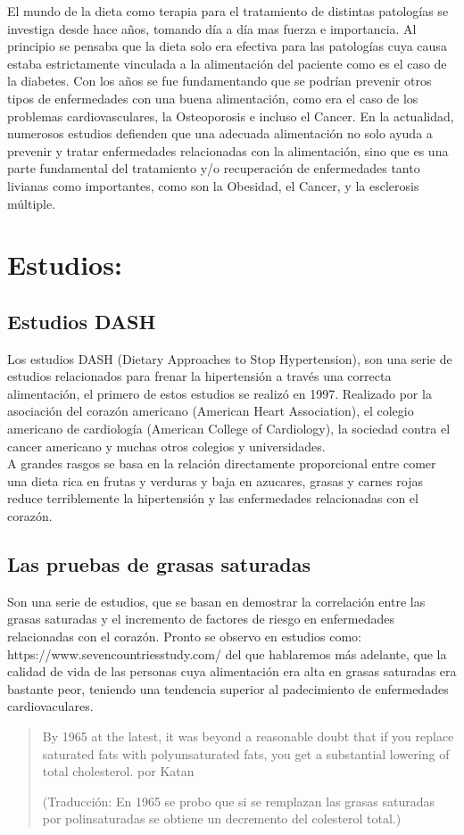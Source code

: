 
El mundo de la dieta como terapia para el tratamiento de distintas patologías se investiga desde hace años, tomando día a día mas fuerza e importancia. Al principio se pensaba que la dieta solo era efectiva para las patologías cuya causa estaba estrictamente vinculada a la alimentación del paciente como es el caso de la diabetes. Con los años se fue fundamentando que se podrían prevenir otros tipos de enfermedades con una buena alimentación, como era el caso de los problemas cardiovasculares, la Osteoporosis e incluso el Cancer. En la actualidad, numerosos estudios defienden que una adecuada alimentación no solo ayuda a prevenir y tratar enfermedades relacionadas con la alimentación, sino que es una parte fundamental del tratamiento y/o recuperación de enfermedades tanto livianas como importantes, como son la Obesidad, el Cancer, y la esclerosis múltiple.
\section{Estudios:} 
\label{estudios}
\subsection{Estudios DASH} 
Los estudios DASH (Dietary Approaches to Stop Hypertension), son una serie de estudios relacionados para frenar la hipertensión a través una correcta alimentación, el primero de estos estudios se realizó en 1997. Realizado por la asociación del corazón americano (American Heart Association), el colegio americano de cardiología (American College of Cardiology), la sociedad contra el cancer americano y muchas otros colegios y universidades.\\

A grandes rasgos se basa en la relación directamente proporcional entre comer una dieta rica en frutas y verduras y baja en azucares, grasas y carnes rojas reduce terriblemente la hipertensión y las enfermedades relacionadas con el corazón.\\
\subsection{Las pruebas de grasas saturadas}
Son una serie de estudios, que se basan en demostrar la correlación entre las grasas saturadas y el incremento de factores de riesgo en enfermedades relacionadas con el corazón.
Pronto se observo en estudios como: https://www.sevencountriesstudy.com/ del que hablaremos más adelante, que la calidad de vida de las personas cuya alimentación era alta en grasas saturadas era bastante peor, teniendo una tendencia superior al padecimiento de enfermedades cardiovaculares.\\
\begin{quote}
By 1965 at the latest, it was beyond a reasonable doubt that if you replace saturated fats with polyunsaturated fats, you get a substantial lowering of total cholesterol. por Katan

(Traducción: En 1965 se probo que si se remplazan las grasas saturadas por polinsaturadas se obtiene un decremento del colesterol total.)
\end{quote}

